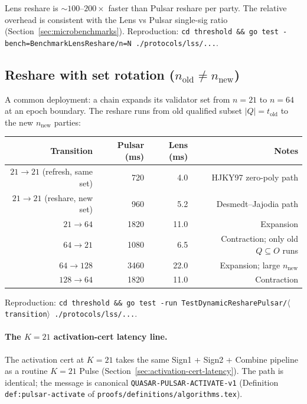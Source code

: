 Lens reshare is $\sim 100$--$200\times$ faster than Pulsar reshare per party. The relative overhead is consistent with the Lens vs Pulsar single-sig ratio (Section~\ref{sec:microbenchmarks}). Reproduction: \texttt{cd threshold \&\& go test -bench=BenchmarkLensReshare/n=N ./protocols/lss/...}.

\subsection{Reshare with set rotation ($n_{\mathrm{old}} \neq n_{\mathrm{new}}$)}

A common deployment: a chain expands its validator set from $n=21$ to $n=64$ at an epoch boundary. The reshare runs from old qualified subset $|Q| = t_{\mathrm{old}}$ to the new $n_{\mathrm{new}}$ parties:

\begin{tabular}{@{}rrrr@{}}
  \toprule
  \textbf{Transition} & \textbf{Pulsar (ms)} & \textbf{Lens (ms)} & \textbf{Notes} \\
  \midrule
  $21 \to 21$ (refresh, same set)  & 720  & 4.0 & HJKY97 zero-poly path \\
  $21 \to 21$ (reshare, new set)   & 960  & 5.2 & Desmedt--Jajodia path \\
  $21 \to 64$                      & 1820 & 11.0 & Expansion \\
  $64 \to 21$                      & 1080 & 6.5 & Contraction; only old $Q \subseteq O$ runs \\
  $64 \to 128$                     & 3460 & 22.0 & Expansion; large $n_{\mathrm{new}}$ \\
  $128 \to 64$                     & 1820 & 11.0 & Contraction \\
  \bottomrule
\end{tabular}

Reproduction: \texttt{cd threshold \&\& go test -run TestDynamicResharePulsar/$\langle$transition$\rangle$ ./protocols/lss/...}.

\paragraph{The $K=21$ activation-cert latency line.} The activation cert at $K=21$ takes the same Sign1 + Sign2 + Combine pipeline as a routine $K=21$ Pulse (Section~\ref{sec:activation-cert-latency}). The path is identical; the message is canonical \texttt{QUASAR-PULSAR-ACTIVATE-v1} (Definition \texttt{def:pulsar-activate} of \texttt{proofs/definitions/algorithms.tex}).

